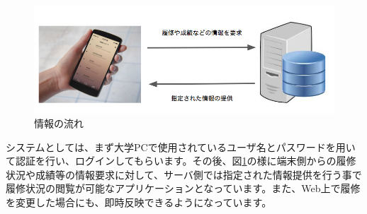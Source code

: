 \begin{figure}[h]
\includegraphics[scale = 0.5]{./nagare.png}
\caption{情報の流れ}
\label{flow}
\end{figure}

システムとしては、まず大学PCで使用されているユーザ名とパスワードを用いて認証を行い、ログインしてもらいます。その後、図\ref{flow}の様に端末側からの履修状況や成績等の情報要求に対して、サーバ側では指定された情報提供を行う事で履修状況の閲覧が可能なアプリケーションとなっています。また、Web上で履修を変更した場合にも、即時反映できるようになっています。
